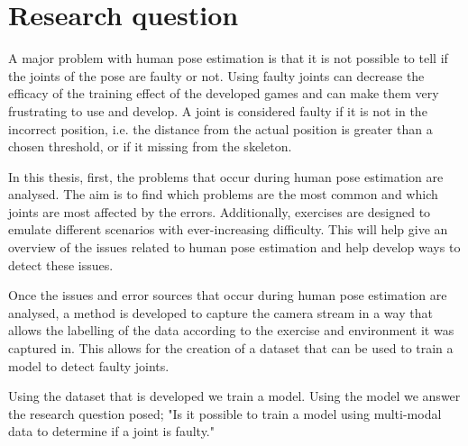 \section{Research question}
A major problem with human pose estimation is that it is not possible to tell if the joints of the pose are faulty or not. Using faulty joints can decrease the efficacy of the training effect of the developed games and can make them very frustrating to use and develop. A joint is considered faulty if it is not in the incorrect position, i.e. the distance from the actual position is greater than a chosen threshold, or if it missing from the skeleton.

In this thesis, first, the problems that occur during human pose estimation are analysed. The aim is to find which problems are the most common and which joints are most affected by the errors. Additionally, exercises are designed to emulate different scenarios with ever-increasing difficulty. This will help give an overview of the issues related to human pose estimation and help develop ways to detect these issues. 

Once the issues and error sources that occur during human pose estimation are analysed, a method is developed to capture the camera stream in a way that allows the labelling of the data according to the exercise and environment it was captured in. This allows for the creation of a dataset that can be used to train a model to detect faulty joints.

Using the dataset that is developed we train a model. Using the model we answer the research question posed; "Is it possible to train a model using multi-modal data to determine if a joint is faulty."
